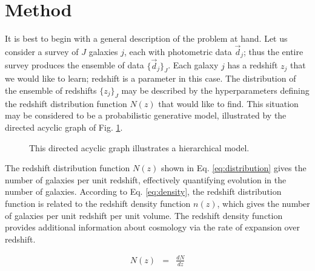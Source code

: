 \documentclass[preprint]{aastex}
\begin{document}
\section{Method}
\label{sec:meth}

It is best to begin with a general description of the problem at hand.  Let us consider a survey of $J$ galaxies $j$, each with photometric data $\vec{d}_{j}$; thus the entire survey produces the ensemble of data $\{\vec{d}_{j}\}_{J}$.  Each galaxy $j$ has a redshift $z_{j}$ that we would like to learn; redshift is a parameter in this case.  The distribution of the ensemble of redshifts $\{z_{j}\}_{J}$ may be described by the hyperparameters defining the redshift distribution function $N(z)$ that would like to find.  This situation may be considered to be a probabilistic generative model, illustrated by the directed acyclic graph of Fig. \ref{fig:flow}.  

\begin{figure}
\vspace{0.5cm}
\begin{center}
\caption{This directed acyclic graph illustrates a hierarchical model.}
\label{fig:flow}
\end{center}
\end{figure}

The redshift distribution function $N(z)$ shown in Eq. \ref{eq:distribution} gives the number of galaxies per unit redshift, effectively quantifying evolution in the number of galaxies.  \citep{men13}  According to Eq. \ref{eq:density}, the redshift distribution function is related to the redshift density function $n(z)$, which gives the number of galaxies per unit redshift per unit volume.  The redshift density function provides additional information about cosmology via the rate of expansion over redshift.

\begin{eqnarray}
\label{eq:distribution}
N(z) &=& \frac{dN}{dz}
\end{eqnarray}
\end{document}
